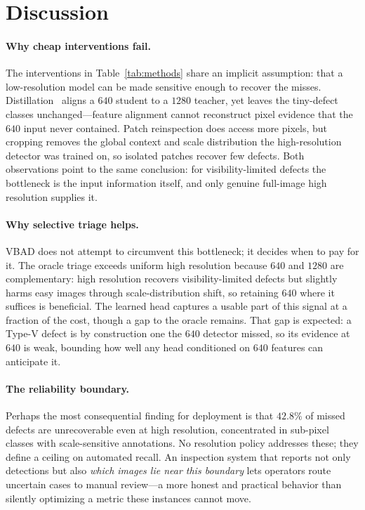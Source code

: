 \section{Discussion}
\label{sec:discussion}

\paragraph{Why cheap interventions fail.}
The interventions in Table~\ref{tab:methods} share an implicit assumption: that
a low-resolution model can be made sensitive enough to recover the misses.
Distillation~\cite{kd} aligns a $640$ student to a $1280$ teacher, yet leaves the
tiny-defect classes unchanged---feature alignment cannot reconstruct pixel
evidence that the $640$ input never contained. Patch reinspection does access
more pixels, but cropping removes the global context and scale distribution the
high-resolution detector was trained on, so isolated patches recover few
defects. Both observations point to the same conclusion: for visibility-limited
defects the bottleneck is the input information itself, and only genuine
full-image high resolution supplies it.

\paragraph{Why selective triage helps.}
VBAD does not attempt to circumvent this bottleneck; it decides when to pay for
it. The oracle triage exceeds uniform high resolution because $640$ and $1280$
are complementary: high resolution recovers visibility-limited defects but
slightly harms easy images through scale-distribution shift, so retaining $640$
where it suffices is beneficial. The learned head captures a usable part of this
signal at a fraction of the cost, though a gap to the oracle remains. That gap
is expected: a Type-V defect is by construction one the $640$ detector missed,
so its evidence at $640$ is weak, bounding how well any head conditioned on
$640$ features can anticipate it.

\paragraph{The reliability boundary.}
Perhaps the most consequential finding for deployment is that $42.8\%$ of missed
defects are unrecoverable even at high resolution, concentrated in sub-pixel
classes with scale-sensitive annotations. No resolution policy addresses these;
they define a ceiling on automated recall. An inspection system that reports not
only detections but also \emph{which images lie near this boundary} lets
operators route uncertain cases to manual review---a more honest and practical
behavior than silently optimizing a metric these instances cannot move.

